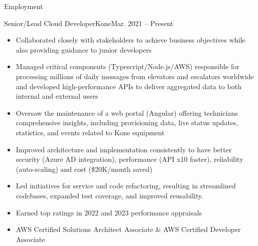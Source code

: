 \documentclass[print]{mcdowellcv}
\begin{document}
	\begin{cvsection}{Employment}
            \begin{cvsubsection}{Senior/Lead Cloud Developer}{Kone}{Mar. 2021 -- Present}
                \begin{itemize}
                    \item Collaborated closely with stakeholders to achieve business objectives while also providing guidance to junior developers
                    \item Managed critical components (Typescript/Node.js/AWS) responsible for processing millions of daily messages from elevators and escalators worldwide and developed high-performance APIs to deliver aggregated data to both internal and external users
                    \item Oversaw the maintenance of a web portal (Angular) offering technicians comprehensive insights, including provisioning data, live status updates, statistics, and events related to Kone equipment
                    \item Improved architecture and implementation consistently to have better security (Azure AD integration), performance (API x10 faster), reliability (auto-scaling) and cost (\$20K/month saved)
                    \item Led initiatives for service and code refactoring, resulting in streamlined codebases, expanded test coverage, and improved reusability.
                    \item Earned top ratings in 2022 and 2023 performance appraisals
                    \item AWS Certified Solutions Architect Associate \& AWS Certified Developer Associate
                \end{itemize}
            \end{cvsubsection}
            

\end{cvsection}
\end{document}
